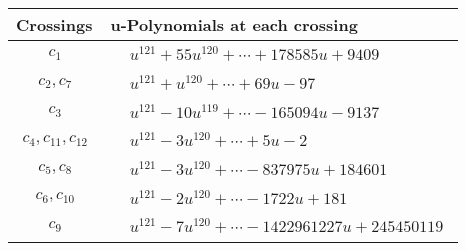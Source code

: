 \documentclass[1p]{elsarticle_modified}
\theoremstyle{definition}
\begin{document}
\begin{tabular}{m{50pt}|m{274pt}}
Crossings & \hspace{64pt}u-Polynomials at each crossing \\
\hline $$\begin{aligned}c_{1}\end{aligned}$$&$\begin{aligned}
&u^{121}+55 u^{120}+\cdots+178585 u+9409
\end{aligned}$\\
\hline $$\begin{aligned}c_{2},c_{7}\end{aligned}$$&$\begin{aligned}
&u^{121}+u^{120}+\cdots+69 u-97
\end{aligned}$\\
\hline $$\begin{aligned}c_{3}\end{aligned}$$&$\begin{aligned}
&u^{121}-10 u^{119}+\cdots-165094 u-9137
\end{aligned}$\\
\hline $$\begin{aligned}c_{4},c_{11},c_{12}\end{aligned}$$&$\begin{aligned}
&u^{121}-3 u^{120}+\cdots+5 u-2
\end{aligned}$\\
\hline $$\begin{aligned}c_{5},c_{8}\end{aligned}$$&$\begin{aligned}
&u^{121}-3 u^{120}+\cdots-837975 u+184601
\end{aligned}$\\
\hline $$\begin{aligned}c_{6},c_{10}\end{aligned}$$&$\begin{aligned}
&u^{121}-2 u^{120}+\cdots-1722 u+181
\end{aligned}$\\
\hline $$\begin{aligned}c_{9}\end{aligned}$$&$\begin{aligned}
&u^{121}-7 u^{120}+\cdots-1422961227 u+245450119
\end{aligned}$\\
\hline
\end{tabular}\\~\\
\end{document}
